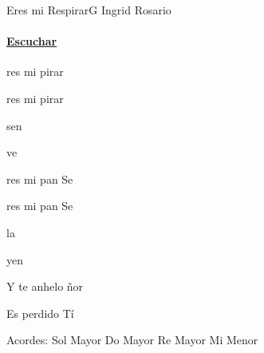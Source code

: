 \documentclass[12pt, spanish]{book}
\begin{document}
    \begin{song}{Eres mi Respirar}{G}
    {} %
    {Ingrid Rosario}
    {} %
    {}
        \ifChordBk
        \paragraph{\mbox{}\hfill\protect\href{https://open.spotify.com/intl-es/track/5RHBAg3cPHYOh6Fx2MUbYS}{Escuchar}\mbox{}\hfill}
        \fi

        \begin{SBOpGroup}
            res mi pirar

            res mi pirar

              sen

            ve  
        \end{SBOpGroup}

        \begin{SBOpGroup}
            res mi pan Se

            res mi pan Se

              la

            yen  
        \end{SBOpGroup}

        \begin{SBChorus}
            Y  te anhelo ñor

            Es perdido  Tí
        \end{SBChorus}

        \ifChordBk
        \begin{SBOpGroup}
            Acordes:
            \upchord{\G}\qquad Sol Mayor \hfill
            \upchord{\C}\qquad Do Mayor \hfill\null\break
            \upchord{\D}\qquad Re Mayor \hfill
            \upchord{\Em}\qquad Mi Menor \hfill\null\break
        \end{SBOpGroup}
        \fi
    \end{song}
\end{document}
